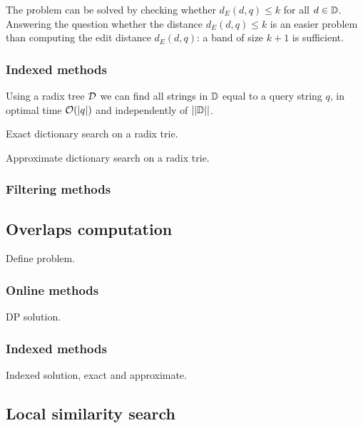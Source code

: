 The problem can be solved by checking whether $d_E(d,q) \leq k$ for all $d \in \mathbb {D}$.
Answering the question whether the distance $d_E(d,q) \leq k$ is an easier problem than computing the edit distance $d_E(d,q)$: a band of size $k+1$ is sufficient.

\subsubsection{Indexed methods}

Using a radix tree $\mathcal {D}$ we can find all strings in $\mathbb {D}$ equal to a query string $q$, in optimal time $\mathcal{O}(|q|)$ and independently of $||\mathbb {D}||$.

\begin{algorithm}[h]
\caption{Exact dictionary search on a radix trie.}
\label{alg:dict-exact}
\end{algorithm}

\begin{algorithm}[h]
\caption{Approximate dictionary search on a radix trie.}
\label{alg:dict-edit}
\end{algorithm}

\subsubsection{Filtering methods}


 

\subsection{Overlaps computation}

Define problem.

\subsubsection{Online methods}

DP solution.

\subsubsection{Indexed methods}

Indexed solution, exact and approximate.



\subsection{Local similarity search}

